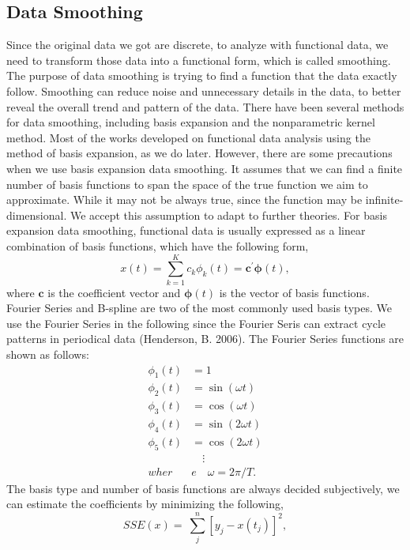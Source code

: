 \subsection{Data Smoothing}
Since the original data we got are discrete, to analyze with functional data, we need to transform those data into a functional form, which is called smoothing. The purpose of data smoothing is trying to find a function that the data exactly follow.  Smoothing can reduce noise and unnecessary details in the data, to better reveal the overall trend and pattern of the data. There have been several methods for data smoothing, including basis expansion and the nonparametric kernel method. Most of the works developed on functional data analysis using the method of basis expansion, as we do later. However, there are some precautions when we use basis expansion data smoothing. It assumes that we can find a finite number of basis functions to span the space of the true function we aim to approximate. While it may not be always true, since the function may be infinite-dimensional. We accept this assumption to adapt to further theories. For basis expansion data smoothing, functional data is usually expressed as a linear combination of basis functions, which have the following form,
\begin{equation}
x(t) = \sum\limits_{k=1}^K c_{k}\phi_{k}(t)= \bm c^{\prime} \bm\phi(t),
\label{func1}
\end{equation}
where $\bm c$ is the coefficient vector and $\bm \phi(t)$ is the vector of basis functions. Fourier Series and B-spline are two of the most commonly used basis types. We use the Fourier Series in the following since the Fourier Seris can extract cycle patterns in periodical data (Henderson, B. 2006). The Fourier Series functions are shown as follows: 
\begin{align*}
\phi_{1}(t) &= 1\\
\phi_{2}(t) &= \sin(\omega t)\\
\phi_{3}(t) &= \cos(\omega t)\\
\phi_{4}(t) &= \sin(2\omega t)\\
\phi_{5}(t) &= \cos(2\omega t)\\
&\quad  \vdots\\
wher&e \quad \omega = 2 \pi / T.
\end{align*}
The basis type and number of basis functions are always decided subjectively, we can estimate the coefficients by minimizing the following,\\
\begin{equation}
SSE\left(x\right)=\ \sum_{j}^{n}\left[y_j-x\left(t_j\right)\right]^2,
\label{func2}
\end{equation}
